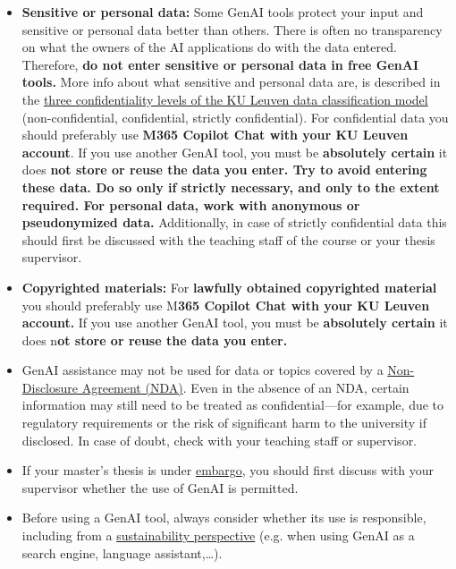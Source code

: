 \begin{itemize}
    \item \textbf{Sensitive or personal data:} Some GenAI tools protect your input and sensitive or personal data better than others. There is often no transparency on what the owners of the AI applications do with the data entered. Therefore, \textbf{do not enter sensitive or personal data in free GenAI tools.} More info about what sensitive and personal data are, is described in the \href{https://www.kuleuven.be/english/education/leuvenlearninglab/support/toolguide/guidelines-for-safe-use-of-genai-tools}{three confidentiality levels of the KU Leuven data classification model} (non-confidential, confidential, strictly confidential). For confidential data you should preferably use \textbf{M365 Copilot Chat with your KU Leuven account}. If you use another GenAI tool, you must be \textbf{absolutely certain} it does \textbf{not store or reuse the data you enter. Try to avoid entering these data. Do so only if strictly necessary, and only to the extent required. For personal data, work with anonymous or pseudonymized data.} Additionally, in case of strictly confidential data this should first be discussed with the teaching staff of the course or your thesis supervisor.
    
    \item \textbf{Copyrighted materials:} For \textbf{lawfully obtained copyrighted material} you should preferably use M\textbf{365 Copilot Chat with your KU Leuven account.} If you use another GenAI tool, you must be \textbf{absolutely certain} it does n\textbf{ot store or reuse the data you enter.}
    
    \item GenAI assistance may not be used for data or topics covered by a \href{https://www.kuleuven.be/english/stuvo/student-legal-services/research-with-interaction-with-a-company-or-organisation}{Non-Disclosure Agreement (NDA)}. Even in the absence of an NDA, certain information may still need to be treated as confidential—for example, due to regulatory requirements or the risk of significant harm to the university if disclosed. In case of doubt, check with your teaching staff or supervisor.
    
    \item If your master’s thesis is under \href{https://iiw.kuleuven.be/english/students/master-thesis/embargo}{embargo}, you should first discuss with your supervisor whether the use of GenAI is permitted.
    
    \item Before using a GenAI tool, always consider whether its use is responsible, including from a \href{https://www.kuleuven.be/english/genai/sustainable-and-responsible-use-of-genai}{sustainability perspective} (e.g. when using GenAI as a search engine, language assistant,…).
    

\end{itemize}
